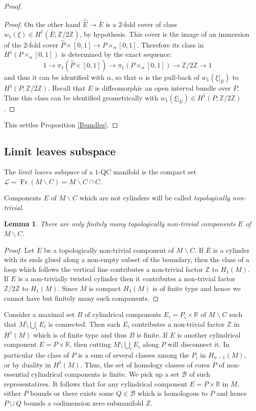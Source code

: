 \documentclass[JEP,XML,SOM,Unicode]{cedram}
\let\mathcal\mathscr
\let\moins\smallsetminus
\DeclareMathOperator{\Fr}{Fr}
\newtheorem{lemma}[theorem]{Lemma}
\theoremstyle{definition}
\theoremstyle{remark}
\numberwithin{equation}{section}
\newcommand{\RR}{\mathbb R}
\newcommand{\ZZ}{\mathbb Z}
\begin{document}
\begin{proof}
\begin{proof}
On the other hand $\overline{\widehat{E}}\to\overline{E}$ is a 2-fold cover of class $w_1(\xi)\in H^1(\overline{E};\ZZ/2\ZZ)$, by hypothesis.
This cover is the image of an immersion of
the 2-fold cover $\widehat{P}\times [0,1]\to P\times_{\alpha} [0,1]$. Therefore its class in
$H^1(P\times_{\alpha} [0,1])$ is determined by the exact sequence:
\[ 1\to \pi_1(\widehat{P}\times [0,1])\to \pi_1(P\times_{\alpha} [0,1])\to \ZZ/2\ZZ\to 1\]
and thus it can be identified with $\alpha$, so that $\alpha$ is the pull-back
of $w_1(\xi|_{\overline{E}})$ to $H^1(P;\ZZ/2\ZZ)$. Recall that $E$ is diffeomorphic an open interval bundle over $P$. Thus this class can be identified geometrically with $w_1(\xi|_{E})\in H^1(P;\ZZ/2\ZZ)$.
\end{proof}
This settles Proposition \ref{Ibundles}.
\end{proof}

\subsection{Limit leaves subspace}
The \emph{limit leaves subspace} of a $1$-QC manifold is
the compact set $\mathcal L=\Fr(M\moins C)=\overline{M\moins C}\cap C$.

Components $E$ of $M\moins C$ which are not cylinders will be called \emph{topologically non-trivial}.
\begin{lemma}
There are only finitely many topologically non-trivial components $E$ of $M\moins C$.
\end{lemma}
\begin{proof}
Let $E$ be a topologically non-trivial component of $M\moins C$.
If $\overline{E}$ is a cylinder with its ends glued along a non-empty subset of the boundary,
then the class of a loop which follows the vertical line
contributes a non-trivial factor $\ZZ$ to $H_1(M)$. If $E$ is a non-trivially twisted cylinder
then it contributes a non-trivial factor $\ZZ/2\ZZ$ to $H_1(M)$. Since $M$ is compact $H_1(M)$ is
of finite type and hence we cannot have but finitely many such components.
\end{proof}

Consider a maximal set $B$ of cylindrical components $E_i=P_i\times \RR$ of $M\moins C$ such that
$M\setminus \bigcup_i E_i$ is connected. Then each $E_i$ contributes a non-trivial factor
$\ZZ$ in $H^1(M)$ which is of finite type and thus $B$ is finite. If $E$ is another
cylindrical component $E=P\times \RR$, then cutting $M\setminus \bigcup_i E_i$ along $P$ will disconnect it.
In particular the class of $P$ is a sum of several classes among the $P_i$ in $H_{n-1}(M)$, or by
duality in $H^1(M)$. Thus, the set of homology classes of cores $P$ of non-essential
cylindrical components is finite. We pick up a set $\mathcal B$ of such representatives.
It follows that for any cylindrical component
$E=P\times \RR$ in $M$, either $P$ bounds or there exists some $Q\in \mathcal B$
which is homologous to $P$ and hence $P\cup Q$ bounds a codimension zero submanifold $Z$.
\end{document}
